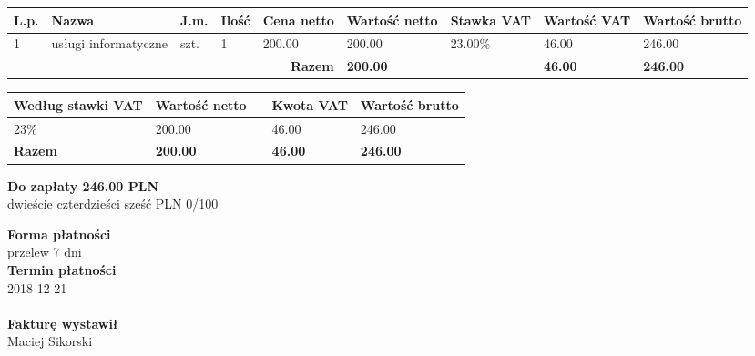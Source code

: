 \documentclass[a4paper,10pt]{article}
\begin{document}
    \begin{table}[H]
    \raggedleft
    \begin{tabular}{| p{} | p{}  | p{} | p{}| p{} | p{} | p{} | p{} | p{} |}
    \hline
    \textbf{L.p.} & \textbf{Nazwa} & \textbf{J.m.} & \textbf{Ilość} & \textbf{Cena netto} & \textbf{Wartość netto} & \textbf{Stawka VAT} & \textbf{Wartość VAT} & \textbf{Wartość brutto} \\ \hline
  
    1 & usługi informatyczne & szt. & 1 & 200.00 & 200.00 & 23.00\% & 46.00 & 246.00 \\ \hline
  
    \hline
    \multicolumn{5}{|r|}{\textbf{Razem}} & \textbf{200.00} & \cellcolor[gray]{0.9} & \textbf{46.00} & \textbf{246.00} \\ \hline
    \end{tabular}
    \end{table}
  
    \begin{table}[H]
    \raggedleft
    \begin{tabular}{| p{} | p{} | p{} | p{} | p{} |}
    \hline
    \textbf{Według stawki VAT} & \textbf{Wartość netto} & \cellcolor[gray]{0.9} & \textbf{Kwota VAT} & \textbf{Wartość brutto} \\ \hline
  
    23\% & 200.00 & \cellcolor[gray]{0.9} & 46.00 & 246.00 \\ \hline
  
  \hline
  {\textbf{Razem}}  & \textbf{200.00} & \cellcolor[gray]{0.9} & \textbf{46.00} & \textbf{246.00} \\ \hline
  \end{tabular}
  \end{table}

  \noindent
  \begin{flushright}
  \textbf{\LARGE{Do zapłaty} 246.00 PLN}\\
  dwieście czterdzieści sześć PLN 0/100
  \end{flushright}

  \vfill
  \noindent
  \textbf{Forma płatności}\\
  przelew 7 dni\\
  \textbf{Termin płatności}\\
  2018-12-21\\
  \\
  
  \noindent
    \textbf{Fakturę wystawił}\\
    Maciej Sikorski
    \vfill
    
\end{document}
